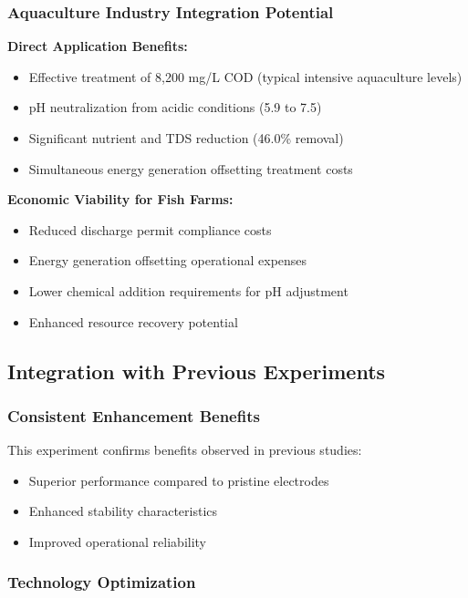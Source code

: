 \documentclass[12pt,a4paper]{article}
\begin{document}
\subsubsection{Aquaculture Industry Integration Potential}

\textbf{Direct Application Benefits:}
\begin{itemize}
    \item Effective treatment of 8,200 mg/L COD (typical intensive aquaculture levels)
    \item pH neutralization from acidic conditions (5.9 to 7.5)
    \item Significant nutrient and TDS reduction (46.0\% removal)
    \item Simultaneous energy generation offsetting treatment costs
\end{itemize}

\textbf{Economic Viability for Fish Farms:}
\begin{itemize}
    \item Reduced discharge permit compliance costs
    \item Energy generation offsetting operational expenses  
    \item Lower chemical addition requirements for pH adjustment
    \item Enhanced resource recovery potential
\end{itemize}

\subsection{Integration with Previous Experiments}

\subsubsection{Consistent Enhancement Benefits}

This experiment confirms benefits observed in previous studies:
\begin{itemize}
    \item Superior performance compared to pristine electrodes
    \item Enhanced stability characteristics
    \item Improved operational reliability
\end{itemize}

\subsubsection{Technology Optimization}
\end{document}
